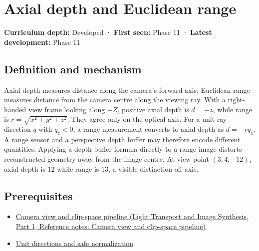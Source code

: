 \hypertarget{appendix-cac01ebeeb11}{}\label{referencestart:appendix-cac01ebeeb11}
\section{Axial depth and Euclidean range}\label{appendix-cac01ebeeb11-axial-depth-and-euclidean-range}

\hypertarget{appendix-cac01ebeeb11-axial-depth-and-euclidean-range}{}

\textbf{Curriculum depth:} Developed · \textbf{First seen:} Phase 11 · \textbf{Latest development:} Phase 11

\begin{allmightroledefinition}

\subsection{Definition and mechanism}\label{appendix-cac01ebeeb11-definition-and-mechanism}

\hypertarget{appendix-cac01ebeeb11-definition-and-mechanism}{}

Axial depth measures distance along the camera's forward axis; Euclidean range measures distance from the camera centre along the viewing ray. With a right-handed view frame looking along \(-Z\), positive axial depth is \(d=-z\), while range is \(r=\sqrt{x^2+y^2+z^2}\). They agree only on the optical axis. For a unit ray direction \(q\) with \(q_z<0\), a range measurement converts to axial depth as \(d=-rq_z\). A range sensor and a perspective depth buffer may therefore encode different quantities. Applying a depth-buffer formula directly to a range image distorts reconstructed geometry away from the image centre. At view point \((3,4,-12)\), axial depth is \(12\) while range is \(13\), a visible distinction off-axis.

\end{allmightroledefinition}

\subsection{Prerequisites}\label{appendix-cac01ebeeb11-prerequisites}

\hypertarget{appendix-cac01ebeeb11-prerequisites}{}

\begin{itemize}
\tightlist
\item
  \href{../04-Light-Transport-and-Image-Synthesis-P01/main.pdf\#nameddest=appendix-1c07d64f5e70}{Camera view and clip-space pipeline (Light Transport and Image Synthesis, Part 1, Reference notes: Camera view and clip-space pipeline)}
\item
  \hyperref[appendix-f744e41b95b4]{Unit directions and safe normalization}
\end{itemize}

